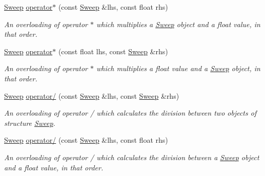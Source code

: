 \begin{DoxyCompactItemize}
\mbox{\label{structSweep_a12c1f3e5e4869781ca7d90a50f334606}} 
\hyperlink{structSweep}{Sweep} \hyperlink{structSweep_a12c1f3e5e4869781ca7d90a50f334606}{operator$\ast$} (const \hyperlink{structSweep}{Sweep} \&lhs, const float rhs)
\begin{DoxyCompactList}\small\item\em An overloading of operator $\ast$ which multiplies a {\itshape \hyperlink{structSweep}{Sweep}} object and a {\itshape float} value, in that order. \end{DoxyCompactList}\item 
\mbox{\label{structSweep_ad4aac4ab6e7ea49d5bc9ebfa83eb07be}} 
\hyperlink{structSweep}{Sweep} \hyperlink{structSweep_ad4aac4ab6e7ea49d5bc9ebfa83eb07be}{operator$\ast$} (const float lhs, const \hyperlink{structSweep}{Sweep} \&rhs)
\begin{DoxyCompactList}\small\item\em An overloading of operator $\ast$ which multiplies a {\itshape float} value and a {\itshape \hyperlink{structSweep}{Sweep}} object, in that order. \end{DoxyCompactList}\item 
\mbox{\label{structSweep_a3e230f15cb1119940203a1a452676b74}} 
\hyperlink{structSweep}{Sweep} \hyperlink{structSweep_a3e230f15cb1119940203a1a452676b74}{operator/} (const \hyperlink{structSweep}{Sweep} \&lhs, const \hyperlink{structSweep}{Sweep} \&rhs)
\begin{DoxyCompactList}\small\item\em An overloading of operator / which calculates the division between two objects of structure {\itshape \hyperlink{structSweep}{Sweep}}. \end{DoxyCompactList}\item 
\mbox{\label{structSweep_a73694ded6e7ba41c367ca5f0934cbc2c}} 
\hyperlink{structSweep}{Sweep} \hyperlink{structSweep_a73694ded6e7ba41c367ca5f0934cbc2c}{operator/} (const \hyperlink{structSweep}{Sweep} \&lhs, const float rhs)
\begin{DoxyCompactList}\small\item\em An overloading of operator / which calculates the division between a {\itshape \hyperlink{structSweep}{Sweep}} object and a {\itshape float} value, in that order. \end{DoxyCompactList}\item 

\end{DoxyCompactItemize}
